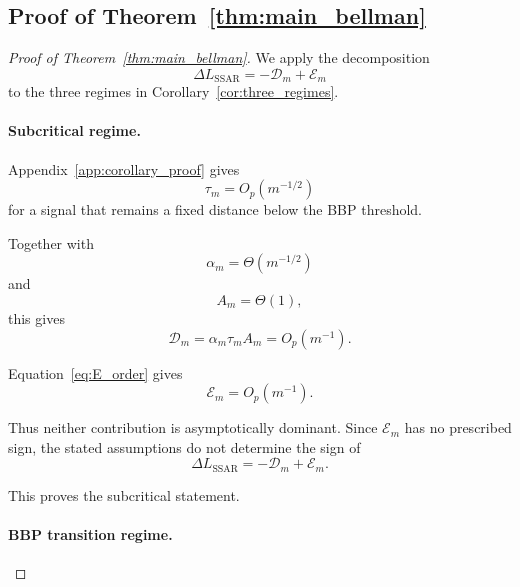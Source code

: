 \subsection{Proof of Theorem~\ref{thm:main_bellman}}

\begin{proof}[Proof of Theorem~\ref{thm:main_bellman}]

We apply the decomposition
\begin{equation}
\Delta L_{\mathrm{SSAR}}
=
-\mathcal D_m+\mathcal E_m
\end{equation}
to the three regimes in Corollary~\ref{cor:three_regimes}.


\paragraph{Subcritical regime.}

Appendix~\ref{app:corollary_proof} gives
\begin{equation}
\tau_m
=
O_p(m^{-1/2})
\end{equation}
for a signal that remains a fixed distance below the BBP threshold.

Together with
\begin{equation}
\alpha_m=\Theta(m^{-1/2})
\end{equation}
and
\begin{equation}
A_m=\Theta(1),
\end{equation}
this gives
\begin{equation}
\mathcal D_m
=
\alpha_m\tau_mA_m
=
O_p(m^{-1}).
\end{equation}

Equation~\eqref{eq:E_order} gives
\begin{equation}
\mathcal E_m
=
O_p(m^{-1}).
\end{equation}

Thus neither contribution is asymptotically dominant. Since
$\mathcal E_m$ has no prescribed sign, the stated assumptions do not
determine the sign of
\begin{equation}
\Delta L_{\mathrm{SSAR}}
=
-\mathcal D_m+\mathcal E_m.
\end{equation}

This proves the subcritical statement.


\paragraph{BBP transition regime.}


\end{proof}
